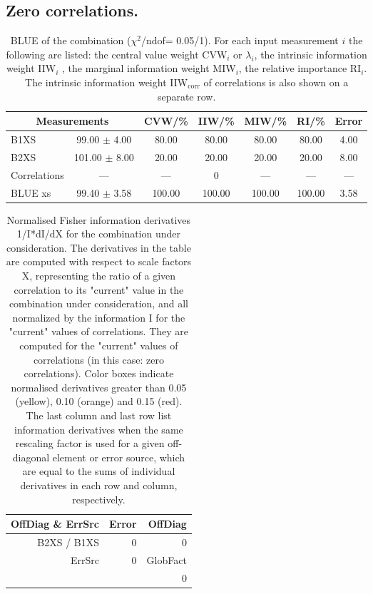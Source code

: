 \subsection{Zero correlations.}
\begin{table}[H]
\scriptsize
\begin{center}
\renewcommand{\arraystretch}{1.1}
\begin{tabular}{|lc|c|c|c|c|c|}
\hline
\multicolumn{2}{|c|}{Measurements} & CVW/\%  & IIW/\%  & MIW/\%  & RI/\%  & {\tiny Error}\\
\hline
B1XS &      99.00 $\pm$       4.00 &      80.00 &      80.00 &      80.00 &      80.00 &       4.00\\
B2XS &     101.00 $\pm$       8.00 &      20.00 &      20.00 &      20.00 &      20.00 &       8.00\\
Correlations & --- & --- &  0 & --- & --- & ---\\
\hline
BLUE {\tiny xs} &      99.40 $\pm$       3.58 &     100.00 &     100.00 &     100.00 &     100.00 &       3.58\\
\hline
\end{tabular}
\caption{BLUE of the combination ($\chi^2$/ndof=      0.05/1).
 For each input measurement $i$ the following are listed: the central value weight CVW$_i$ or $\lambda_i$, the intrinsic information weight IIW$_i$ , the marginal information weight MIW$_i$, the relative importance RI$_i$. The intrinsic information weight IIW$_{\mathrm{corr}}$ of correlations is also shown on a separate row.}
\renewcommand{\arraystretch}{1}
\end{center}
\end{table}
\begin{table}[H]
\scriptsize
\begin{center}
\renewcommand{\arraystretch}{1.1}
\begin{tabular}{|r|r|r|}
\hline
 OffDiag \& ErrSrc & {\tiny Error} & OffDiag\\
\hline
B2XS / B1XS &  0 &  0 \\
\hline
\multirow{2}{*}{ErrSrc} & \multirow{2}{*}{ 0} & GlobFact\\
 & &  0 \\
\hline
\end{tabular}
\renewcommand{\arraystretch}{1}
\caption{Normalised Fisher information derivatives 1/I*dI/dX for the combination under consideration. The derivatives in the table are computed with respect to scale factors X, representing the ratio of a given correlation to its "current" value in the combination under consideration, and all normalized by the information I for the "current" values of correlations. They are computed for the "current" values of correlations (in this case: zero correlations). Color boxes indicate normalised derivatives greater than 0.05 (yellow), 0.10 (orange) and 0.15 (red). The last column and last row list information derivatives when the same rescaling factor is used for a given off-diagonal element or error source, which are equal to the sums of individual derivatives in each row and column, respectively.}
\end{center}
\end{table}
